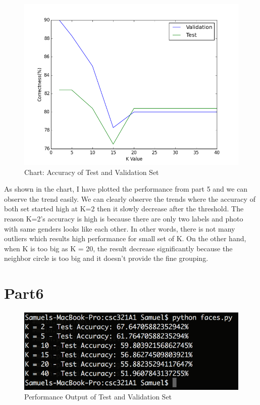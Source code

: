 \documentclass[12pt]{article} %
\begin{document}
\begin{figure}[H] %
  \centering 
  \begin{minipage}[b]{0.7\textwidth}
    \includegraphics[width=\textwidth]{part5_2}
    \caption{Chart: Accuracy of Test and Validation Set}
  \end{minipage}
\end{figure}

As shown in the chart, I have plotted the performance from part 5 and we can observe the trend easily. We can clearly observe the trends where the accuracy of both set started high at K=2 then it slowly decrease after the threshold. The reason K=2’s accuracy is high is because there are only two labels and photo with same genders looks like each other. In other words, there is not many outliers which results high performance for small set of K. On the other hand, when K is too big as K = 20, the result decrease significantly because the neighbor circle is too big and it doesn’t provide the fine grouping.



\section{Part6} %

\begin{figure}[H] %
  \centering 
  \begin{minipage}[b]{0.7\textwidth}
    \includegraphics[width=\textwidth]{part6_1}
    \caption{Performance Output of Test and Validation Set}
  \end{minipage}
\end{figure}
\end{document}
